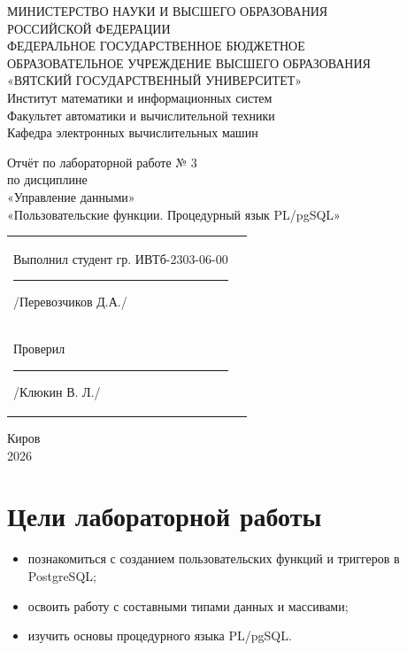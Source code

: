 \documentclass[oneside,a4paper,14pt]{extarticle}
\begin{document}
\newpage\thispagestyle{empty}

\begin{center}
МИНИСТЕРСТВО НАУКИ И ВЫСШЕГО ОБРАЗОВАНИЯ\\
РОССИЙСКОЙ ФЕДЕРАЦИИ\\
ФЕДЕРАЛЬНОЕ ГОСУДАРСТВЕННОЕ БЮДЖЕТНОЕ\\
ОБРАЗОВАТЕЛЬНОЕ УЧРЕЖДЕНИЕ ВЫСШЕГО ОБРАЗОВАНИЯ\\
«ВЯТСКИЙ ГОСУДАРСТВЕННЫЙ УНИВЕРСИТЕТ»\\
Институт математики и информационных систем\\
Факультет автоматики и вычислительной техники\\
Кафедра электронных вычислительных машин
\end{center}

\vspace{30mm}

\begin{center}
Отчёт по лабораторной работе № 3\\
по дисциплине\\
«Управление данными»\\
«Пользовательские функции. Процедурный язык PL/pgSQL»
\end{center}

\vspace{40mm}

\noindent
\begin{tabular}{l r}
Выполнил студент гр. ИВТб-2303-06-00 \hspace{3mm}\rule[-1mm]{20mm}{0.15mm} /Перевозчиков Д.А./ \\

Проверил \hspace{57mm}\rule[-1mm]{20mm}{0.15mm} /Клюкин В. Л./
\end{tabular}

\vfill
\begin{center}
Киров\\
2026
\end{center}


\newpage\thispagestyle{empty}

\section{Цели лабораторной работы}

\begin{itemize}
    \item познакомиться с созданием пользовательских функций и триггеров в PostgreSQL;
    \item освоить работу с составными типами данных и массивами;
    \item изучить основы процедурного языка PL/pgSQL.
\end{itemize}
\end{document}
